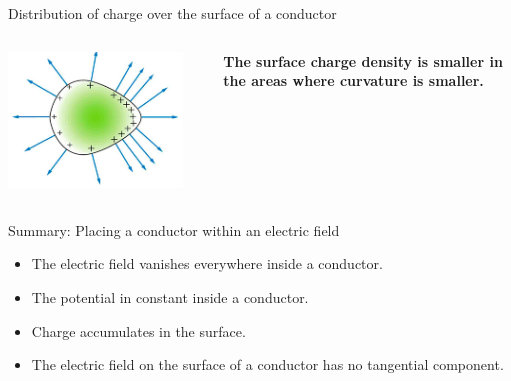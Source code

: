 \begin{frame}{Distribution of charge over the surface of a conductor}
\begin{columns}
  \begin{column}{0.50\textwidth}
      \begin{center}
        \includegraphics[width=0.90\textwidth]{./images/schematics/distribution_of_charge_over_surface_of_conductor.png}\\
      \end{center}
  \end{column}
  \begin{column}{0.40\textwidth}
    {\bf The surface charge density is smaller in the areas where curvature is smaller.}\\
  \end{column}
\end{columns}

\end{frame}

%
%
%

\begin{frame}{Summary: Placing a conductor within an electric field}

\begin{itemize}
  \item The electric field vanishes everywhere inside a conductor.
  \item The potential in constant inside a conductor.
  \item Charge accumulates in the surface.
  \item The electric field on the surface of a conductor has no tangential component.
\end{itemize}


\end{frame}


